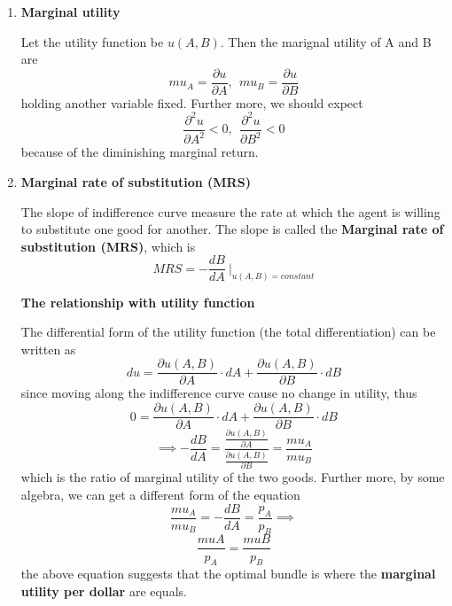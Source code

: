 \documentclass[10pt]{article}
\newenvironment{changemargin}[2]{%
  \begin{list}{}{%
    \setlength{\topsep}{0pt}%
    \setlength{\leftmargin}{#1}%
    \setlength{\rightmargin}{#2}%
    \setlength{\listparindent}{\parindent}%
    \setlength{\itemindent}{\parindent}%
    \setlength{\parsep}{\parskip}%
  }%
  \item[]}{\end{list}}
\begin{document}
\begin{changemargin}{-0.125in}{0in}
\begin{enumerate}
           \smallskip
           
           \begin{enumerate}
             \item \textbf{Marginal utility}
             
             \smallskip
             
             Let the utility function be $u(A,B)$. Then the marignal utility of A and B are 
                 \[
                 mu_A = \frac{\partial u}{\partial A}, \:\: mu_B = \frac{\partial u}{\partial B}
                 \]
                 holding another variable fixed. Further more, we should expect 
                 \[
                 \frac{\partial^2u}{\partial A^2} < 0,\:\: \frac{\partial^2u}{\partial B^2} < 0
                 \]
                 because of the diminishing marginal return.
                 
                 \medskip
                 
                 \item \textbf{Marginal rate of substitution (MRS)}
                     
                     \smallskip
                     
                     The slope of indifference curve measure the rate at which the agent is willing to substitute one good for another. The slope is called the \textbf{Marginal rate of substitution (MRS)}, which is 
                     \[
                     MRS = -\frac{dB}{dA} \: \big|_{u(A,B) = constant}
                     \]
                     
                     \smallskip
                     
                     \textbf{The relationship with utility function} 
                     
                     The differential form of the utility function (the total differentiation) can be written as 
                     \[
                     du = \frac{\partial u(A,B)}{\partial A} \cdot dA + \frac{\partial u(A,B)}{\partial B} \cdot dB
                     \]
                     since moving along the indifference curve cause no change in utility, thus
                     \[
                     0 =  \frac{\partial u(A,B)}{\partial A} \cdot dA + \frac{\partial u(A,B)}{\partial B} \cdot dB
                     \]
                     \[
                     \implies -\frac{dB}{dA} = \frac{\frac{\partial u(A,B)}{\partial A} }{\frac{\partial u(A,B)}{\partial B}} = \frac{mu_A}{mu_B}
                     \]
                     which is the ratio of marginal utility of the two goods. Further more, by some algebra, we can get a different form of the equation
                     \[
                     \frac{mu_A}{mu_B} = -\frac{dB}{dA} = \frac{p_A}{p_B} \implies
                     \]
                     \[
                     \frac{muA}{p_A} = \frac{muB}{p_B}
                     \]
                     the above equation suggests that the optimal bundle is where the \textbf{marginal utility per dollar} are equals.
           \end{enumerate}
         

\end{enumerate}
\end{changemargin}
\end{document}
